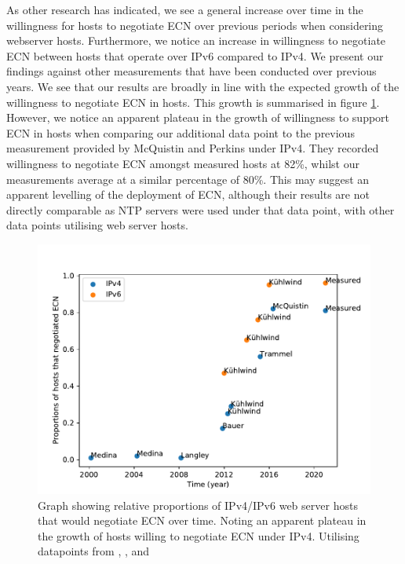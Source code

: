 \documentclass{l4proj}
\begin{document}
As other research has indicated, we see a general increase over time in the willingness for hosts to negotiate ECN over previous periods when considering webserver hosts. Furthermore, we notice an increase in willingness to negotiate ECN between hosts that operate over IPv6 compared to IPv4.  We present our findings against other measurements that have been conducted over previous years. We see that our results are broadly in line with the expected growth of the willingness to negotiate ECN in hosts. This growth is summarised in figure \ref{fig:ecngrowth}. However, we notice an apparent plateau in the growth of willingness to support ECN in hosts when comparing our additional data point to the previous measurement provided by McQuistin and Perkins \cite{mcquistin_is_2015} under IPv4. They recorded willingness to negotiate ECN amongst measured hosts at 82\%, whilst our measurements average at a similar percentage of 80\%. This may suggest an apparent levelling of the deployment of ECN, although their results are not directly comparable as NTP servers were used under that data point, with other data points utilising web server hosts.

\begin{figure}[H]
    \centering
    \includegraphics[scale=0.7]{dissertation/images/ecn_trends.pdf}
    \caption{Graph showing relative proportions of IPv4/IPv6 web server hosts that would negotiate ECN over time. Noting an apparent plateau in the growth of hosts willing to negotiate ECN under IPv4. Utilising datapoints from \cite{bauer_measuring_2011}, \cite{medina_measuring_2004}, \cite{bauer_measuring_2011} and \cite{kuhlewind_state_2013}}
    \label{fig:ecngrowth}
\end{figure}
\end{document}

